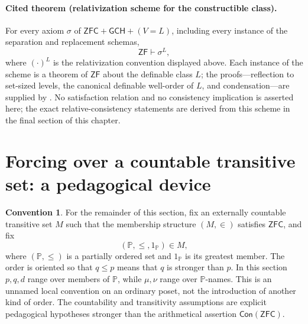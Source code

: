 \documentclass[11pt,oneside,openany]{book}
\theoremstyle{definition}
\newtheorem{convention}[definition]{Convention}
\theoremstyle{plain}
\theoremstyle{remark}
\newcommand{\derives}{\vdash}
\newcommand{\ZF}{\mathsf{ZF}}
\newcommand{\ZFC}{\mathsf{ZFC}}
\begin{document}
\paragraph{Cited theorem (relativization scheme for the constructible
class).}
For every axiom \(\sigma\) of \(\ZFC+\mathsf{GCH}+(V=L)\), including every
instance of the separation and replacement schemas,
\[
  \ZF\derives\sigma^{L},
\]
where \((\cdot)^{L}\) is the relativization convention displayed above.
Each instance of the scheme is a theorem of \(\ZF\) about the definable
class \(L\); the proofs---reflection to set-sized levels, the canonical
definable well-order of \(L\), and condensation---are supplied by
\cite[Chapter~13, pp.~175--200]{Jech2003}.  No satisfaction relation and no
consistency implication is asserted here; the exact relative-consistency
statements are derived from this scheme in the final section of this
chapter.

\section{Forcing over a countable transitive set: a pedagogical device}
\label{sec:constructibility-forcing-02}

\begin{convention}
For the remainder of this section, fix an externally countable transitive set
\(M\) such that the membership structure \((M,\in)\) satisfies \(\ZFC\), and
fix
\[
  (\mathbb P,\leq,1_{\mathbb P})\in M,
\]
where \((\mathbb P,\leq)\) is a partially ordered set and
\(1_{\mathbb P}\) is its greatest member.  The order is oriented so that
\(q\leq p\) means that \(q\) is stronger than \(p\).  In this section
\(p,q,d\) range over members of \(\mathbb P\), while \(\mu,\nu\) range over
\(\mathbb P\)-names.  This is an unnamed local convention on an ordinary
poset, not the introduction of another kind of order.  The countability and
transitivity assumptions are explicit pedagogical hypotheses stronger than
the arithmetical assertion \(\mathsf{Con}(\ZFC)\).
\end{convention}
\end{document}
